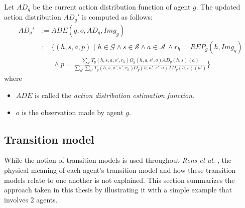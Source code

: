 \begin{definition} 
\label{def:actup2}
Let $AD_g$ be the current action distribution function of agent $g$. The updated action distribution $AD_g'$ is computed as follows:
\begin{align*}
     AD_g' &:= ADE(g, o, AD_g, Img_g) \\&:= \Bigg\{(h,s,a,p) \,\,\Bigg| \,\, h \in \mathcal{G} \land s \in \mathcal{S} \land a \in \mathcal{A} \,\land r_h = REP_g(h, Img_g)
     \\& \,\,\,\,\,\,\,\,\,\,\, \land p =  \frac{\sum_{s'} T_g(h,s,a,s',r_h) O_g(h,a,s',o) AD_g(h,s)(a)}{\sum_{a'} \sum_{s'} T_g(h,s,a',s',r_h) O_g(h,a',s',o) AD_g(h,s)(a')} \Bigg\}
\end{align*}
where
\begin{itemize}
    \item $ADE$ is called the \textit{action distribution estimation function}.
    \item $o$ is the observation made by agent $g$.
\end{itemize}
\end{definition}






\subsection{Transition model}
\label{sub:totaltrans}
While the notion of transition models is used throughout \textit{Rens et al.} \cite{rensetal}, the physical meaning of each agent's transition model and how these transition models relate to one another is not explained. This section summarizes the approach taken in this thesis by illustrating it with a simple example that involves 2 agents.

